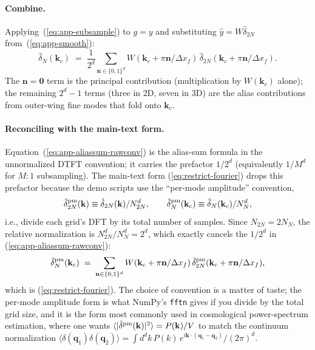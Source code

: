 \documentclass[12pt]{article}
\begin{document}
\paragraph{Combine.}
Applying~(\ref{eq:app-subsample}) to $g=y$ and substituting
$\hat y = W\hat\delta_{2N}$ from~(\ref{eq:app-smooth}):
\begin{equation}\label{eq:app-aliassum-rawconv}
  \hat\delta_N(\mathbf k_c) \;=\; \frac{1}{2^d}
  \sum_{\mathbf n\in\{0,1\}^d}
  W(\mathbf k_c + \pi\mathbf n/\Delta x_f)\,
  \hat\delta_{2N}(\mathbf k_c + \pi\mathbf n/\Delta x_f).
\end{equation}
The $\mathbf n=\mathbf 0$ term is the principal contribution
(multiplication by $W(\mathbf k_c)$ alone); the remaining $2^d-1$
terms (three in 2D, seven in 3D) are the alias contributions from
outer-wing fine modes that fold onto $\mathbf k_c$.

\paragraph{Reconciling with the main-text form.}
Equation~(\ref{eq:app-aliassum-rawconv}) is the alias-sum formula in
the unnormalized DTFT convention; it carries the prefactor $1/2^d$
(equivalently $1/M^d$ for $M{:}1$ subsampling). The main-text form
(\ref{eq:restrict-fourier}) drops this prefactor because the demo
scripts use the ``per-mode amplitude'' convention,
\begin{equation}
  \hat\delta_{2N}^{\rm pm}(\mathbf k) \equiv \hat\delta_{2N}(\mathbf k)/N_{2N}^d,
  \qquad
  \hat\delta_N^{\rm pm}(\mathbf k_c) \equiv \hat\delta_N(\mathbf k_c)/N_N^d,
\end{equation}
i.e., divide each grid's DFT by its total number of samples. Since
$N_{2N} = 2 N_N$, the relative normalization is $N_{2N}^d/N_N^d = 2^d$,
which exactly cancels the $1/2^d$ in
(\ref{eq:app-aliassum-rawconv}):
\begin{equation}
  \hat\delta_N^{\rm pm}(\mathbf k_c) \;=\;
  \sum_{\mathbf n\in\{0,1\}^d}
  W(\mathbf k_c + \pi\mathbf n/\Delta x_f)\,
  \hat\delta_{2N}^{\rm pm}(\mathbf k_c + \pi\mathbf n/\Delta x_f),
\end{equation}
which is (\ref{eq:restrict-fourier}). The choice of convention is a
matter of taste; the per-mode amplitude form is what NumPy's
\texttt{fftn} gives if you divide by the total grid size, and it is
the form most commonly used in cosmological power-spectrum estimation,
where one wants
$\langle|\hat\delta^{\rm pm}(\mathbf k)|^2\rangle = P(\mathbf k)/V$
to match the continuum normalization
$\langle\delta(\mathbf q_1)\delta(\mathbf q_2)\rangle = \int d^d k\,P(k)\,e^{i\mathbf k\cdot(\mathbf q_1-\mathbf q_2)}/(2\pi)^d$.
\end{document}
